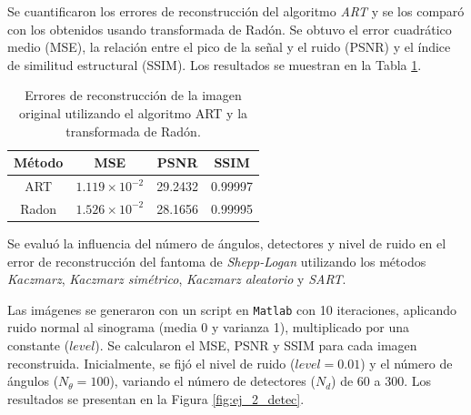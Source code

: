 \documentclass[11pt, twocolumn]{article}
\begin{document}
Se cuantificaron los errores de reconstrucción del algoritmo \textit{ART} y se los comparó con los obtenidos usando transformada de Radón. Se obtuvo el error cuadrático medio (MSE), la relación entre el pico de la señal y el ruido (PSNR) y el índice de similitud estructural (SSIM). Los resultados se muestran en la Tabla \ref{tab:ej_2_recont}.

\begin{table}[htbp]
  \centering
  \begin{tabular}{|c|c|c|c|}
    \hline
    \textbf{Método} & \textbf{MSE} & \textbf{PSNR} & \textbf{SSIM} \\ \hline
    ART & $1.119\times10^{-2}$ & 29.2432 & 0.99997 \\ \hline
    Radon & $1.526\times10^{-2}$ & 28.1656 & 0.99995 \\ \hline
  \end{tabular}
  \caption{Errores de reconstrucción de la imagen original utilizando el algoritmo ART y la transformada de Radón.}
  \label{tab:ej_2_recont}
\end{table}

Se evaluó la influencia del número de ángulos, detectores y nivel de ruido en el error de reconstrucción del fantoma de \textit{Shepp-Logan} utilizando los métodos \textit{Kaczmarz}, \textit{Kaczmarz simétrico}, \textit{Kaczmarz aleatorio} y \textit{SART}.

Las imágenes se generaron con un script en \texttt{Matlab} con 10 iteraciones, aplicando ruido normal al sinograma (media 0 y varianza 1), multiplicado por una constante ($level$). Se calcularon el MSE, PSNR y SSIM para cada imagen reconstruida. Inicialmente, se fijó el nivel de ruido ($level = 0.01$) y el número de ángulos ($N_\theta = 100$), variando el número de detectores ($N_d$) de 60 a 300. Los resultados se presentan en la Figura \ref{fig:ej_2_detec}.
\end{document}
